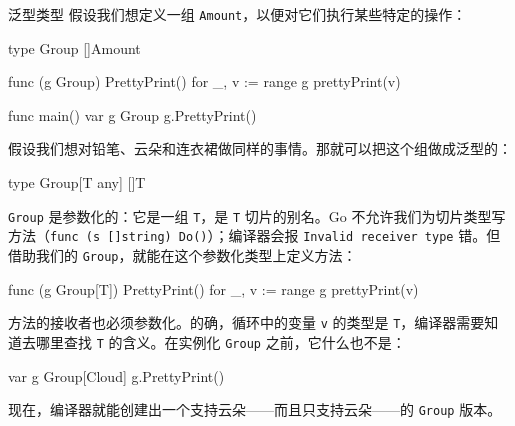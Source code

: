 \begin{infobox}{泛型类型}
假设我们想定义一组 \texttt{Amount}，以便对它们执行某些特定的操作：

\begin{gocode}[]
type Group []Amount

func (g Group) PrettyPrint() {
    for _, v := range g {
        prettyPrint(v)
    }
}

func main() {
    var g Group
    g.PrettyPrint()
}
\end{gocode}

假设我们想对铅笔、云朵和连衣裙做同样的事情。那就可以把这个组做成泛型的：

\begin{gocode}[]
type Group[T any] []T
\end{gocode}

\texttt{Group} 是参数化的：它是一组 \texttt{T}，是 \texttt{T} 切片的别名。Go 不允许我们为切片类型写方法（\texttt{func (s []string) Do()}）；编译器会报 \texttt{Invalid receiver type} 错。但借助我们的 \texttt{Group}，就能在这个参数化类型上定义方法：

\begin{gocode}[]
func (g Group[T]) PrettyPrint() {
    for _, v := range g {
        prettyPrint(v)
    }
}
\end{gocode}

方法的接收者也必须参数化。的确，循环中的变量 \texttt{v} 的类型是 \texttt{T}，编译器需要知道去哪里查找 \texttt{T} 的含义。在实例化 \texttt{Group} 之前，它什么也不是：

\begin{gocode}[]
var g Group[Cloud]
g.PrettyPrint()
\end{gocode}

现在，编译器就能创建出一个支持云朵——而且只支持云朵——的 \texttt{Group} 版本。
\end{infobox}

